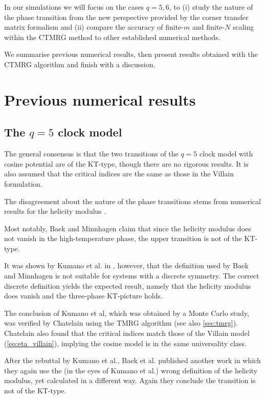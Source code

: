 In our simulations we will focus on the cases $q = 5, 6$, to (i) study the nature of the phase transition from the new
perspective provided by the corner transfer matrix formalism and (ii) compare the accuracy of finite-$m$ and finite-$N$
scaling within the CTMRG method to other established numerical methods.

We summarise previous numerical results, then present results obtained with the CTMRG algorithm and finish with a
discussion.

\section{Previous numerical results}
\subsection{The $q = 5$ clock model}

The general consensus is that the two transitions of the $q = 5$ clock model with cosine potential are of the KT-type,
though there are no rigorous results.
It is also assumed that the critical indices are the same as those in the Villain formulation.

The disagreement about the nature of the phase transitions
stems from numerical results for the helicity modulus
\cite{fisher1973helicity}.

Most notably, Baek and Minnhagen \cite{baek2010non} claim that since the helicity modulus does
not vanish in the high-temperature phase, the upper transition is not of the KT-type.

It was shown by Kumano et al.
in \cite{kumano2013response}, however, that the definition used by Baek and Minnhagen is not suitable for systems with a
discrete symmetry.
The correct discrete definition yields the expected result, namely that the helicity modulus does vanish and the
three-phase KT-picture holds.

The conclusion of Kumano et al, which was obtained by a Monte Carlo study,
was verified by Chatelain \cite{chatelain2014dmrg} using the TMRG algorithm \cite{nishino1995density} (see also
\autoref{sec:tmrg}).
Chatelain also found that the critical indices match those of the Villain model (\autoref{eq:eta_villain}),
implying the cosine model is in the same universality class.

After the rebuttal by Kumano et al., Baek et al.
published another work \cite{baek2013residual} in which they again use the (in the eyes of Kumano et al.) wrong
definition of the helicity modulus, yet calculated in a different way.
Again they conclude the transition is not of the KT-type.

